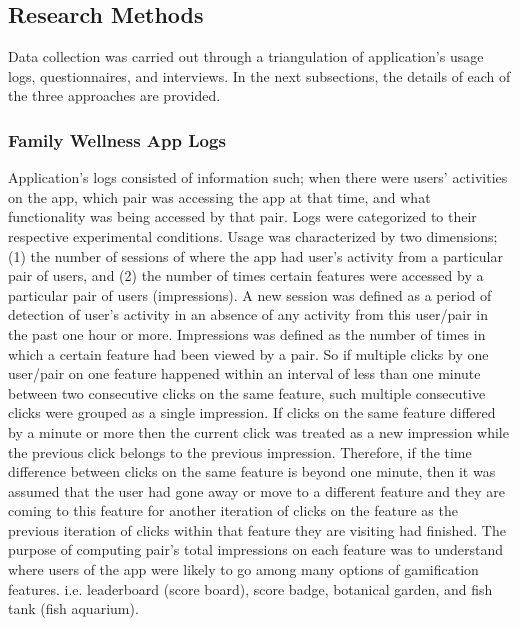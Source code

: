 \subsection{Research Methods}
Data collection was carried out through a triangulation of application's usage logs, questionnaires, and interviews. In the next subsections, the details of each of the three approaches are provided. 
\subsubsection{Family Wellness App Logs}
Application's logs consisted of information such; when there were users' activities on the app, which pair was accessing the app at that time, and what functionality was being accessed by that pair. Logs were categorized to their respective experimental conditions. Usage was characterized by two dimensions; (1) the number of sessions of where the app had user's activity from a particular pair of users, and (2) the number of times certain features were accessed by a particular pair of users (impressions). A new session was defined as a period of detection of user's activity in an absence of any activity from this user/pair in the past one hour or more. Impressions was defined as the number of times in which a certain feature had been viewed by a pair. So if multiple clicks by one user/pair on one feature happened within an interval of less than one minute between two consecutive clicks on the same feature, such multiple consecutive clicks were grouped as a single impression. If clicks on the same feature differed by a minute or more then the current click was treated as a new impression while the previous click belongs to the previous impression. Therefore, if the time difference between clicks on the same feature is beyond one minute, then it was assumed that the user had gone away or move to a different feature and they are coming to this feature for another iteration of clicks on the feature as the previous iteration of clicks within that feature they are visiting had finished. The purpose of computing pair's total impressions on each feature was to understand where users of the app were likely to go among many options of gamification features. i.e. leaderboard (score board), score badge, botanical garden, and fish tank (fish aquarium). 
 
